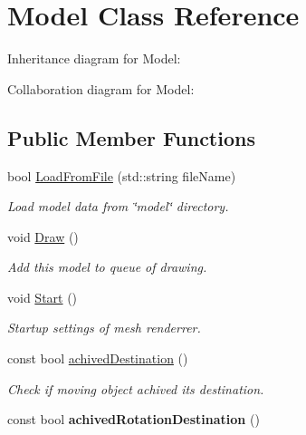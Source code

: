 \hypertarget{class_model}{}\section{Model Class Reference}
\label{class_model}


Inheritance diagram for Model\+:


Collaboration diagram for Model\+:
\subsection*{Public Member Functions}
\begin{DoxyCompactItemize}
\item 
bool \hyperlink{class_model_aeac0bcc4a5389b6ec36db82ce76ee043}{Load\+From\+File} (std\+::string file\+Name)
\begin{DoxyCompactList}\small\item\em Load model data from \char`\"{}model\char`\"{} directory. \end{DoxyCompactList}\item 
\mbox{\label{class_model_a0c668c13fc79a86326f75ea231f3886f}} 
void \hyperlink{class_model_a0c668c13fc79a86326f75ea231f3886f}{Draw} ()
\begin{DoxyCompactList}\small\item\em Add this model to queue of drawing. \end{DoxyCompactList}\item 
\mbox{\label{class_model_a91cd21886c9f6a23d92b32d654f2dfd8}} 
void \hyperlink{class_model_a91cd21886c9f6a23d92b32d654f2dfd8}{Start} ()
\begin{DoxyCompactList}\small\item\em Startup settings of mesh renderrer. \end{DoxyCompactList}\item 
const bool \hyperlink{class_model_aa24e073cc3aa8c325f503a0c73a86241}{achived\+Destination} ()
\begin{DoxyCompactList}\small\item\em Check if moving object achived its destination. \end{DoxyCompactList}\item 
\mbox{\label{class_model_aefa3f6dee6c4c8a65f9ccc17cd6d8899}} 
const bool {\bfseries achived\+Rotation\+Destination} ()
\end{DoxyCompactItemize}
